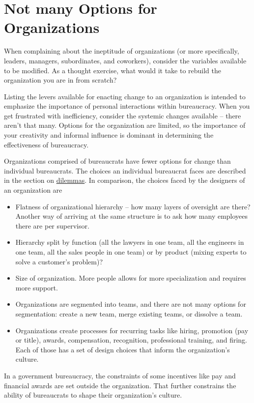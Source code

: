 \section{Not many Options for Organizations}

When complaining about the ineptitude of organizations (or more specifically, leaders, managers, subordinates, and coworkers), consider the variables available to be modified. As a thought exercise, what would it take to rebuild the organization you are in from scratch? 

Listing the levers available for enacting change to an organization is intended to emphasize the importance of personal interactions within bureaucracy. When you get frustrated with inefficiency, consider the systemic changes available -- there aren't that many. Options for the organization are limited, so the importance of your creativity and informal influence is dominant in determining the effectiveness of bureaucracy.

Organizations comprised of bureaucrats have fewer options for change than individual bureaucrats. The choices an individual bureaucrat faces are described in the section on 
\hyperref[sec:dilemma-trilemma]{dilemmas}.
In comparison, the choices faced by the designers of an organization are
\begin{itemize}
    \item Flatness of organizational hierarchy -- how many layers of oversight are there? Another way of arriving at the same structure is to ask how many employees there are per supervisor.
    \item Hierarchy split by function (all the lawyers in one team, all the engineers in one team, all the sales people in one team) or by product (mixing experts to solve a customer's problem)?
    \item Size of organization. More people allows for more specialization and requires more support. 
    \item Organizations are segmented into teams, and there are not many options for segmentation: create a new team, merge existing teams, or dissolve a team.
    \item Organizations create processes for recurring tasks like hiring, promotion (pay or title), awards, compensation, recognition, professional training, and firing. Each of those has a set of design choices that inform the organization's culture.
\end{itemize}
In a government bureaucracy, the constraints of some incentives like pay and financial awards are set outside the organization. That further constrains the ability of bureaucrats to shape their organization's culture.

